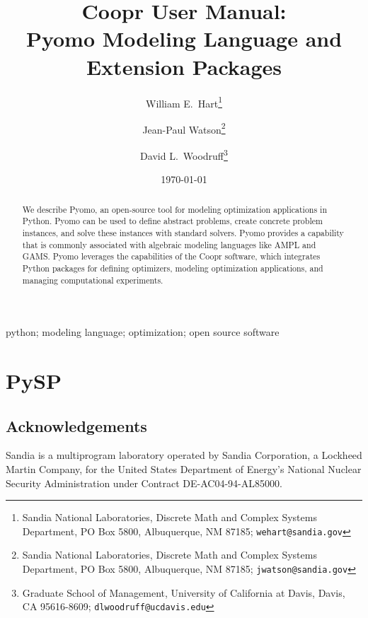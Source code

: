 \documentclass[12pt]{book}
\begin{document}
\title{Coopr User Manual:\\Pyomo Modeling Language and Extension Packages}

\author{William E.\ Hart\footnote{Sandia National Laboratories, Discrete Math and Complex Systems Department, PO Box 5800, Albuquerque, NM 87185; {\tt wehart@sandia.gov}} 
\and
Jean-Paul Watson\footnote{Sandia National Laboratories, Discrete Math and Complex Systems Department, PO Box 5800, Albuquerque, NM 87185; {\tt jwatson@sandia.gov}} 
\and
David L.\ Woodruff\footnote{Graduate School of Management, University of California at Davis,
Davis, CA 95616-8609; {\tt dlwoodruff@ucdavis.edu}}
}

\date{\today}

\maketitle

\begin{abstract}
We describe Pyomo, an open-source tool for modeling optimization applications in Python. Pyomo can be used to define abstract problems, create concrete problem instances, and solve these instances with standard solvers. Pyomo provides a capability that is commonly associated with algebraic modeling languages like AMPL and GAMS.  Pyomo leverages the capabilities of the Coopr software, which integrates Python packages for defining optimizers, modeling optimization applications, and managing computational experiments.
\end{abstract}

 python; modeling language; optimization; open source software
\fi


\lstset{language=Python}
\lstset{aboveskip=1em,belowskip=1em}

\tableofcontents








%
\chapter{PySP}







\section*{Acknowledgements} 

Sandia is a multiprogram laboratory
operated by Sandia Corporation, a Lockheed Martin Company, for the United
States Department of Energy's National Nuclear Security Administration
under Contract DE-AC04-94-AL85000.




\end{document}

